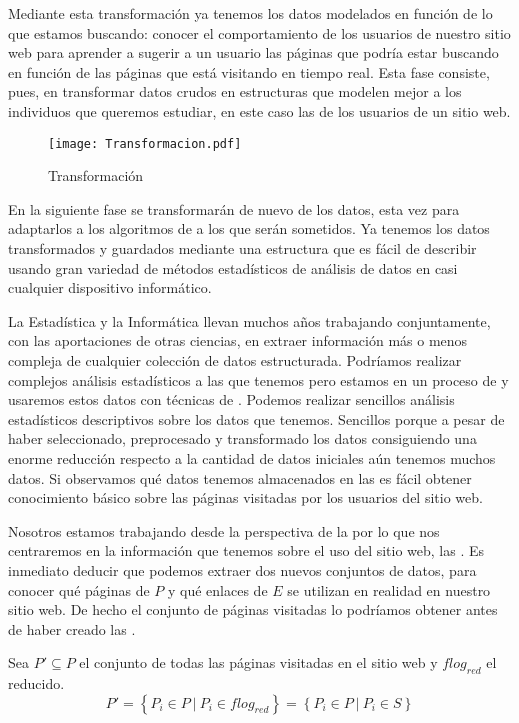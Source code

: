 Mediante esta transformación ya tenemos los datos modelados en función de lo que estamos buscando: conocer el comportamiento de los usuarios de nuestro sitio web para aprender a sugerir a un usuario las páginas que podría estar buscando en función de las páginas que está visitando en tiempo real. Esta fase consiste, pues, en transformar datos crudos en estructuras que modelen mejor a los individuos que queremos estudiar, en este caso las \sns de los usuarios de un sitio web.

\begin{wrapfigure}{o}{0.45\textwidth}
  \centering
  \texttt{[image: Transformacion.pdf]}
	\caption{Transformación}
	\label{fig:Transformacion}
\end{wrapfigure}
En la siguiente fase se transformarán de nuevo de los datos, esta vez para adaptarlos a los algoritmos de \dm a los que serán sometidos. Ya tenemos los datos transformados y guardados mediante una estructura que es fácil de describir usando gran variedad de métodos estadísticos de análisis de datos en casi cualquier dispositivo informático.

La Estadística y la Informática llevan muchos años trabajando conjuntamente, con las aportaciones de otras ciencias, en extraer información más o menos compleja de cualquier colección de datos estructurada. Podríamos realizar complejos análisis estadísticos a las \sns que tenemos pero estamos en un proceso de \wum y usaremos estos datos con técnicas de \dm. Podemos realizar sencillos análisis estadísticos descriptivos sobre los datos que tenemos. Sencillos porque a pesar de haber seleccionado, preprocesado y transformado los datos consiguiendo una enorme reducción respecto a la cantidad de datos iniciales aún tenemos muchos datos. Si observamos qué datos tenemos almacenados en las \sns es fácil obtener conocimiento básico sobre las páginas visitadas por los usuarios del sitio web.






Nosotros estamos trabajando desde la perspectiva de la \WUM por lo que nos centraremos en la información que tenemos sobre el uso del sitio web, las \sns. Es inmediato deducir que podemos extraer dos nuevos conjuntos de datos, para conocer qué páginas de $P$ y qué enlaces de $E$ se utilizan en realidad en nuestro sitio web. De hecho el conjunto de páginas visitadas lo podríamos obtener antes de haber creado las \sns.

\begin{defn}\label{def:1-2-4-cjto-paginasVisitadasSW}
   Sea $P' \subseteq P$ el conjunto de todas las páginas visitadas en el sitio web y $flog_{red}$ el \flog reducido.
  \begin{equation}\label{eq:1-2-4-cjto-paginasVisitadasSW}
     P' = \left\{P_i \in P \ | \ P_i \in flog_{red}\right\} = \left\{P_i \in P \ | \ P_i \in S\right\}
  \end{equation}
\end{defn}

